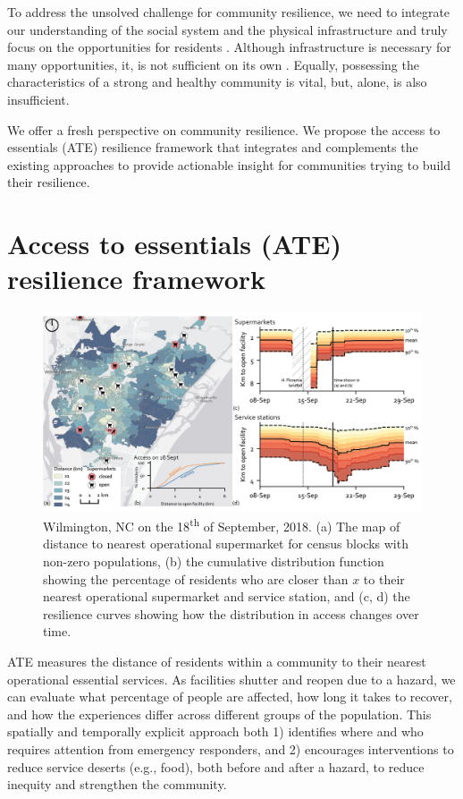\documentclass[9pt,twocolumn,twoside,lineno]{pnas-new}
\begin{document}
To address the unsolved challenge for community resilience, we need to integrate our understanding of the social system and the physical infrastructure and truly focus on the opportunities for residents \cite{Koliou2018-jt, Cutter2016-landscape}.
Although infrastructure is necessary for many opportunities, it, is not sufficient on its own \cite{Doorn2018-fx}.
Equally, possessing the characteristics of a strong and healthy community is vital, but, alone, is also insufficient.

We offer a fresh perspective on community resilience.
We propose the access to essentials (ATE) resilience framework that integrates and complements the existing approaches to provide actionable insight for communities trying to build their resilience.

\section*{Access to essentials (ATE) resilience framework}

\begin{figure}
    \centering
    \includegraphics[width=0.8\linewidth]{report/fig/NC_resilience.png}
    \caption{Wilmington, NC on the 18\textsuperscript{th} of September, 2018. (a) The map of distance to nearest operational supermarket for census blocks with non-zero populations, (b) the cumulative distribution function showing the percentage of residents who are closer than $x$ to their nearest operational supermarket and service station, and (c, d) the resilience curves showing how the distribution in access changes over time.
    }
    \label{fig:fig1}
\end{figure}

ATE measures the distance of residents within a community to their nearest operational essential services. 
As facilities shutter and reopen due to a hazard, we can evaluate what percentage of people are affected, how long it takes to recover, and how the experiences differ across different groups of the population. 
This spatially and temporally explicit approach both 1) identifies where and who requires attention from emergency responders, and 2) encourages interventions to reduce service deserts (e.g., food), both before and after a hazard, to reduce inequity and strengthen the community.
\end{document}
